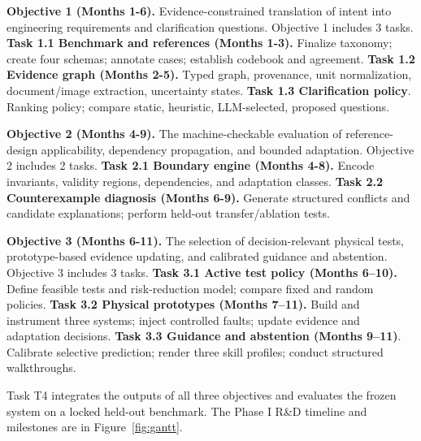\documentclass[11pt,letterpaper]{article}
\begin{document}
\textbf{Objective 1 (Months 1-6).} Evidence-constrained translation of intent into engineering requirements and clarification questions. Objective 1 includes 3 tasks. \textbf{Task 1.1 Benchmark and references (Months 1-3).} Finalize taxonomy; create four schemas; annotate cases; establish codebook and agreement. \textbf{Task 1.2 Evidence graph (Months 2-5).} Typed graph, provenance, unit normalization, document/image extraction, uncertainty states. \textbf{Task 1.3 Clarification policy}. Ranking policy; compare static, heuristic, LLM-selected, proposed questions.

\textbf{Objective 2 (Months 4-9).} The machine-checkable evaluation of reference-design applicability, dependency propagation, and bounded adaptation. Objective 2 includes 2 tasks. \textbf{Task 2.1 Boundary engine (Months 4-8).} Encode invariants, validity regions, dependencies, and adaptation classes. \textbf{Task 2.2 Counterexample diagnosis (Months 6-9).} Generate structured conflicts and candidate explanations; perform held-out transfer/ablation tests. 

\textbf{Objective 3 (Months 6-11).} The selection of decision-relevant physical tests, prototype-based evidence updating, and calibrated guidance and abstention. Objective 3 includes 3 tasks. \textbf{Task 3.1 Active test policy (Months 6--10).} Define feasible tests and risk-reduction model; compare fixed and random policies. \textbf{Task 3.2 Physical prototypes (Months 7--11).} Build and instrument three systems; inject controlled faults; update evidence and adaptation decisions. \textbf{Task 3.3 Guidance and abstention (Months 9--11)}. Calibrate selective prediction; render three skill profiles; conduct structured walkthroughs.



Task T4 integrates the outputs of all three objectives and evaluates the frozen system on a locked held-out benchmark. The Phase I R\&D timeline and milestones are in 
Figure~\ref{fig:gantt}.
\end{document}
